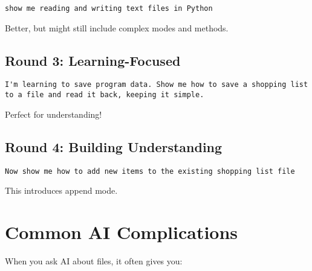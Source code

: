 \documentclass[
  letterpaper,
  DIV=11,
  numbers=noendperiod,
  oneside]{scrreprt}
\begin{document}
\begin{verbatim}
show me reading and writing text files in Python
\end{verbatim}

Better, but might still include complex modes and methods.

\subsection{Round 3: Learning-Focused}\label{round-3-learning-focused-7}

\begin{verbatim}
I'm learning to save program data. Show me how to save a shopping list 
to a file and read it back, keeping it simple.
\end{verbatim}

Perfect for understanding!

\subsection{Round 4: Building
Understanding}\label{round-4-building-understanding-4}

\begin{verbatim}
Now show me how to add new items to the existing shopping list file
\end{verbatim}

This introduces append mode.

\section{Common AI Complications}\label{common-ai-complications-7}

When you ask AI about files, it often gives you:
\end{document}

